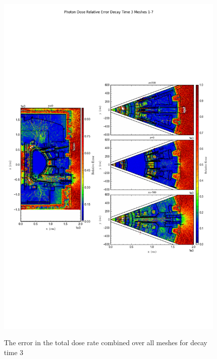 \documentclass[12pt]{article}
\begin{document}
\begin{figure}[ht!]
\centering
\includegraphics[trim={0cm 9cm 0cm 10cm},clip,scale=0.75]{../plots/final_model/Photon_Dose_Relative_Error_Decay_Time_3_Meshes_1-7.png}
\label{fig:photons_dc3_no4bc_total_error}
\caption{The error in the total dose rate combined over all meshes for decay time 3}
\end{figure}
\end{document}
